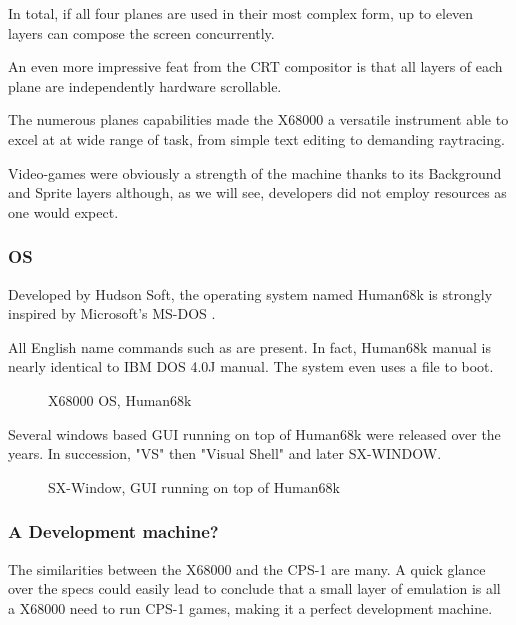 In total, if all four planes are used in their most complex form, up to eleven layers can compose the screen concurrently. 

An even more impressive feat from the CRT compositor is that all layers of each plane are independently hardware scrollable.

The numerous planes capabilities made the X68000 a versatile instrument able to excel at at wide range of task, from simple text editing to demanding raytracing. 

Video-games were obviously a strength of the machine thanks to its Background and Sprite layers although, as we will see, developers did not employ resources as one would expect.








\subsubsection{OS}
Developed by Hudson Soft, the operating system named Human68k is strongly inspired by Microsoft's MS-DOS . 

All English name commands such as  are present. In fact, Human68k manual is nearly identical to IBM DOS 4.0J manual\cite{human68k_manual}. The system even uses a  file to boot.

\begin{figure}[H]
\caption*{X68000 OS, Human68k}
\end{figure}


Several windows based GUI running on top of Human68k were released over the years. In succession, "VS" then "Visual Shell" and later SX-WINDOW.

\begin{figure}[H]
\caption*{SX-Window, GUI running on top of Human68k}
\end{figure}



\subsubsection{A Development machine?}
The similarities between the X68000 and the CPS-1 are many. A quick glance over the specs could easily lead to conclude that a small layer of emulation is all a X68000 need to run CPS-1 games, making it a perfect development machine.

